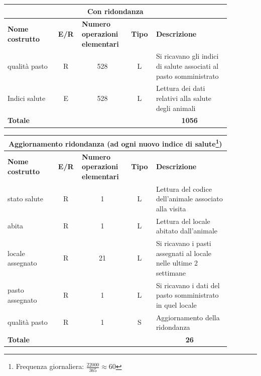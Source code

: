 \documentclass[12pt,a4paper]{article}
\begin{document}
\begin{center}\setlength{\extrarowheight}{1.5pt}\begin{longtable}{|p{0.2\linewidth}|p{0.1\linewidth}|p{0.175\linewidth}|p{0.1\linewidth}|p{0.3\linewidth}|}
\hline
\multicolumn{5}{|c|}{Con ridondanza}
\\
\hline \textbf{Nome costrutto}   & \multicolumn{1}{|c|}{\textbf{E/R}} & \textbf{Numero operazioni elementari} & \multicolumn{1}{|c|}{\textbf{Tipo}} & \textbf{Descrizione}\\ 

\hline
qualità pasto
 & 
\multicolumn{1}{|c|}{R}
 & 
\multicolumn{1}{|c|}{528}
 & 
\multicolumn{1}{|c|}{L}
 & 
Si ricavano gli indici di salute associati al pasto somministrato
\\
\hline
Indici salute
 & 
\multicolumn{1}{|c|}{E}
 & 
\multicolumn{1}{|c|}{528}
 & 
\multicolumn{1}{|c|}{L}
 & 
Lettura dei dati relativi alla salute degli animali
\\
\hline
\multicolumn{4}{|l|}{\textbf{Totale}}
 & 
\multicolumn{1}{|c|}{\textbf{1056}}
\\
\hline
\end{longtable}\end{center}
\begin{center}\setlength{\extrarowheight}{1.5pt}\begin{longtable}{|p{0.2\linewidth}|p{0.1\linewidth}|p{0.175\linewidth}|p{0.1\linewidth}|p{0.3\linewidth}|}
\hline
\multicolumn{5}{|c|}{Aggiornamento ridondanza (ad ogni nuovo indice di salute\footnote{Frequenza giornaliera: $\frac{22000}{365}\approx 60$})}
\\
\hline \textbf{Nome costrutto}   & \multicolumn{1}{|c|}{\textbf{E/R}} & \textbf{Numero operazioni elementari} & \multicolumn{1}{|c|}{\textbf{Tipo}} & \textbf{Descrizione}\\ 

\hline
stato salute
 & 
\multicolumn{1}{|c|}{R}
 & 
\multicolumn{1}{|c|}{1}
 & 
\multicolumn{1}{|c|}{L}
 & 
Lettura del codice dell'animale associato alla visita
\\
\hline
abita
 & 
\multicolumn{1}{|c|}{R}
 & 
\multicolumn{1}{|c|}{1}
 & 
\multicolumn{1}{|c|}{L}
 & 
Lettura del locale abitato dall'animale
\\
\hline
locale assegnato
 & 
\multicolumn{1}{|c|}{R}
 & 
\multicolumn{1}{|c|}{21}
 & 
\multicolumn{1}{|c|}{L}
 & 
Si ricavano i pasti assegnati al locale nelle ultime 2 settimane
\\
\hline
pasto assegnato
 & 
\multicolumn{1}{|c|}{R}
 & 
\multicolumn{1}{|c|}{1}
 & 
\multicolumn{1}{|c|}{L}
 & 
Si ricavano i dati del pasto somministrato in quel locale
\\
\hline
qualità pasto
 & 
\multicolumn{1}{|c|}{R}
 & 
\multicolumn{1}{|c|}{1}
 & 
\multicolumn{1}{|c|}{S}
 & 
Aggiornamento della ridondanza
\\
\hline
\multicolumn{4}{|l|}{\textbf{Totale}}
 & 
\multicolumn{1}{|c|}{\textbf{26}}
\\
\hline
\end{longtable}\end{center}
\end{document}
